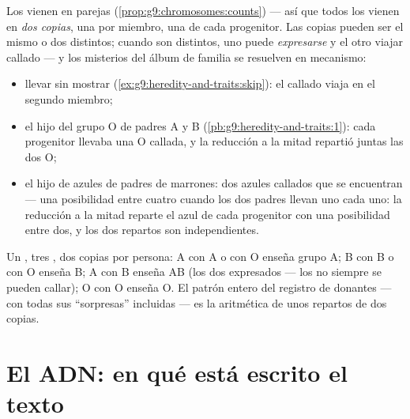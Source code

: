 \begin{proposition}\label{prop:g9:genes-and-dna:twocopies}
Los  vienen en parejas
(\cref{prop:g9:chromosomes:counts}) --- así que todos los  vienen
en \emph{dos copias}, una por miembro, una de cada progenitor. Las
copias pueden ser el mismo  o dos distintos; cuando son distintos,
uno puede \emph{expresarse} y el otro viajar callado --- y los
misterios del álbum de familia se resuelven en mecanismo:
\begin{itemize}
  \item llevar sin mostrar (\cref{ex:g9:heredity-and-traits:skip}): el
         callado viaja en el segundo miembro;
  \item el hijo del grupo O de padres A y B
        (\cref{pb:g9:heredity-and-traits:1}): cada progenitor llevaba
        una O callada, y la reducción a la mitad repartió juntas las
        dos O;
  \item el hijo de  azules de padres de  marrones: dos azules
        callados que se encuentran --- una posibilidad entre cuatro
        cuando los dos padres llevan uno cada uno: la reducción a la
        mitad reparte el azul de cada progenitor con una posibilidad
        entre dos, y los dos repartos son independientes.
\end{itemize}
\end{proposition}
\admitted

\begin{example}\label{ex:g9:genes-and-dna:bloodgroups}
Un , tres , dos copias por persona: A con A o con O enseña
grupo A; B con B o con O enseña B; A con B enseña AB (los dos
expresados --- los  no siempre se pueden callar); O con O enseña
O. El patrón entero del registro de donantes --- con todas sus
``sorpresas'' incluidas --- es la aritmética de unos repartos de dos
copias.
\end{example}

\section{El ADN: en qué está escrito el texto}

